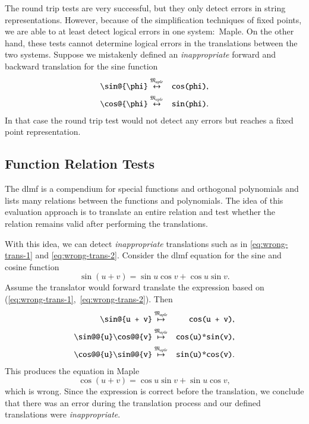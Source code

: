 \documentclass[a4paper,11pt]{article}
\newcommand{\Maple}{Maple}
\newcommand{\langMaple}{\mathfrak{M}_{aple}}
\theoremstyle{defTheoStyle}
\theoremstyle{defExampStyle}
\begin{document}
The round trip tests are very successful, but they only detect errors in string representations. However, because of the simplification techniques of fixed points, we are able to at least detect logical errors in one system:~\Maple. On the other hand, these tests cannot determine logical errors in the translations between the two systems. Suppose we mistakenly defined an \textit{inappropriate} forward and backward translation for the sine function
\begin{eqnarray}
\verb|\sin@{\phi}| & \overset{\langMaple}{\leftrightarrow} & \verb|cos(phi)|,\label{eq:wrong-trans-1}\\
\verb|\cos@{\phi}| & \overset{\langMaple}{\leftrightarrow} & \verb|sin(phi)|.\label{eq:wrong-trans-2}
\end{eqnarray}
In that case the round trip test would not detect any errors but reaches a fixed point representation.

\subsection{Function Relation Tests}\label{sec:relation-tests}
The \gls*{dlmf} is a compendium for special functions and orthogonal polynomials and lists many relations between the functions and polynomials. The idea of this evaluation approach is to translate an entire relation and test whether the relation remains valid after performing the translations.

With this idea, we can detect {\it inappropriate} translations such as in \eqref{eq:wrong-trans-1} and \eqref{eq:wrong-trans-2}. Consider the \gls*{dlmf} equation for the sine and cosine function~\parencite[(4.21.2)]{NIST:DLMF}
\begin{equation}
\sin \left(u+v\right) = \sin{u}\cos{v} + \cos{u}\sin{v}.
\end{equation}
Assume the translator would forward translate the expression based on (\ref{eq:wrong-trans-1},~\ref{eq:wrong-trans-2}). Then
\begin{eqnarray}
\verb|\sin@{u + v}| & \overset{\langMaple}{\mapsto} & \verb|cos(u + v)|,\\
\verb|\sin@@{u}\cos@@{v}| & \overset{\langMaple}{\mapsto} & \verb|cos(u)*sin(v)|,\\
\verb|\cos@@{u}\sin@@{v}| & \overset{\langMaple}{\mapsto} & \verb|sin(u)*cos(v)|.
\end{eqnarray}
This produces the equation in \Maple
\begin{equation}
\cos\left(u+v\right) = \cos{u}\sin{v} + \sin{u}\cos{v},
\end{equation}
which is wrong. Since the expression is correct before the translation, we conclude that there was an error 
during the translation process and our defined translations were {\it inappropriate}.
\end{document}
